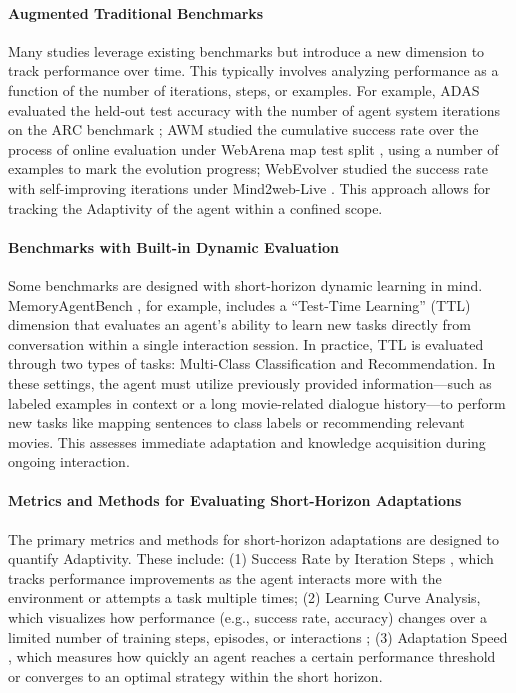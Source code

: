 \documentclass[10pt]{article} %
\begin{document}
\paragraph {Augmented Traditional Benchmarks} Many studies leverage existing benchmarks but introduce a new dimension to track performance over time. This typically involves analyzing performance as a function of the number of iterations, steps, or examples. For example, 
ADAS \citep{hu2024automated} evaluated the held-out test accuracy with the number of agent system iterations on the ARC benchmark \citep{chollet2019measure}; 
AWM \citep{wang2024agent} studied the cumulative success rate over the process of online evaluation under WebArena map test split \citep{zhou2023webarena}, using a number of examples to mark the evolution progress; WebEvolver \citep{fang2025webevolver} studied the success rate with self-improving iterations under Mind2web-Live \citep{pan2024webcanvas}.
This approach allows for tracking the Adaptivity of the agent within a confined scope. 

\paragraph{Benchmarks with Built-in Dynamic Evaluation} Some benchmarks are designed with short-horizon dynamic learning in mind. MemoryAgentBench \citep{hu2025evaluating}, for example, includes a ``Test-Time Learning'' (TTL) dimension that evaluates an agent's ability to learn new tasks directly from conversation within a single interaction session. In practice, TTL is evaluated through two types of tasks: Multi-Class Classification and Recommendation. In these settings, the agent must utilize previously provided information—such as labeled examples in context or a long movie-related dialogue history—to perform new tasks like mapping sentences to class labels or recommending relevant movies. This assesses immediate adaptation and knowledge acquisition during ongoing interaction.

\paragraph{Metrics and Methods for Evaluating Short-Horizon Adaptations} The primary metrics and methods for short-horizon adaptations are designed to quantify Adaptivity. These include: (1) Success Rate by Iteration Steps \citep{hu2024automated, wang2024agent, zheng2025lifelongagentbench}, which tracks performance improvements as the agent interacts more with the environment or attempts a task multiple times; (2) Learning Curve Analysis, which visualizes how performance (e.g., success rate, accuracy) changes over a limited number of training steps, episodes, or interactions \citep{hu2024automated, wang2024agent}; (3) Adaptation Speed \citep{wang2023voyager}, which measures how quickly an agent reaches a certain performance threshold or converges to an optimal strategy within the short horizon. 
\end{document}
